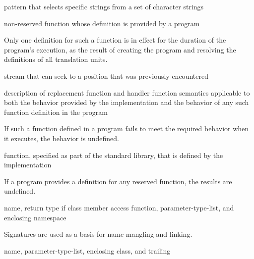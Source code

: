 pattern that selects specific strings
from a set of character strings

%
non-reserved function
whose definition is provided by a \Cpp{} program

\begin{defnote}
Only one definition for such a function is in effect for the duration of the program's
execution, as the result of creating the program and resolving the
definitions of all translation units.
\end{defnote}

%
stream that can seek to a position that was previously encountered

%
description of replacement function and handler function semantics
applicable to both the behavior provided by the implementation and
the behavior of any such function definition in the program

\begin{defnote}
If such a function defined in a \Cpp{} program fails to meet the required
behavior when it executes, the behavior is undefined.%
\end{defnote}

%
function, specified as part of the \Cpp{} standard library, that is defined by the
implementation

\begin{defnote}
If a \Cpp{} program provides a definition for any reserved function, the results are undefined.%
\end{defnote}

%
name,
return type if class member access function,
parameter-type-list,
and enclosing namespace

\begin{defnote}
Signatures are used as a basis for
name mangling and linking.
\end{defnote}

%
name,
parameter-type-list,
enclosing class,
and
trailing 


